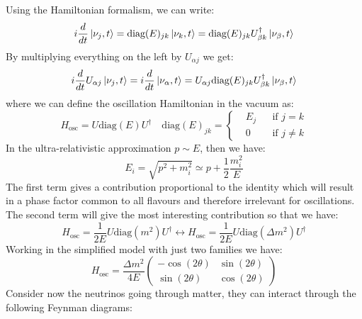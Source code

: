 \documentclass[10.75pt,a4paper,openright,bottom=2cm]{article}
\begin{document}
Using the Hamiltonian formalism, we can write:
\[
i\frac{d}{dt}\ket{\nu_j,t}=\text{diag}(E)_{jk}\ket{\nu_k,t}=\text{diag}(E)_{jk}U^\dagger_{\beta k}\ket{\nu_\beta,t}
\]
By multiplying everything on the left by $U_{\alpha j}$ we get:
\[
i\frac{d}{dt}U_{\alpha j}\ket{\nu_j,t}=i\frac{d}{dt}\ket{\nu_\alpha,t}=U_{\alpha j}\text{diag}(E)_{jk}U^\dagger_{\beta k}\ket{\nu_\beta,t}
\]
where we can define the oscillation Hamiltonian in the vacuum as:
\[
H_{\text{osc}}=U\text{diag}(E)U^\dagger \quad \text{diag}(E)_{jk}=\left\{\begin{aligned}
&E_j &&\text{if $j=k$}\\
&0 &&\text{if $j\neq k$} 
\end{aligned}
\right.
\]
In the ultra-relativistic approximation $p\sim E$, then we have:
\[
E_i=\sqrt{p^2+m_i^2}\simeq p+\frac{1}{2}\frac{m_i^2}{E}
\]
The first term gives a contribution proportional to the identity which will result in a phase factor common to all flavours and therefore irrelevant for oscillations. The second term will give the most interesting contribution so that we have:
\[
H_{\text{osc}}=\frac{1}{2E}U\text{diag}(m^2)U^\dagger\longleftrightarrow H_{\text{osc}}=\frac{1}{2E}U\text{diag}(\Delta m^2)U^\dagger
\]
Working in the simplified model with just two families we have:
\[
H_{\text{osc}}=\frac{\Delta m^2}{4E}\left(\begin{array}{cc}
    -\cos(2\theta) & \sin(2\theta) \\
    \sin(2\theta) & \cos(2\theta)
\end{array}\right)
\]
Consider now the neutrinos going through matter, they can interact through the following Feynman diagrams:\\
\end{document}
